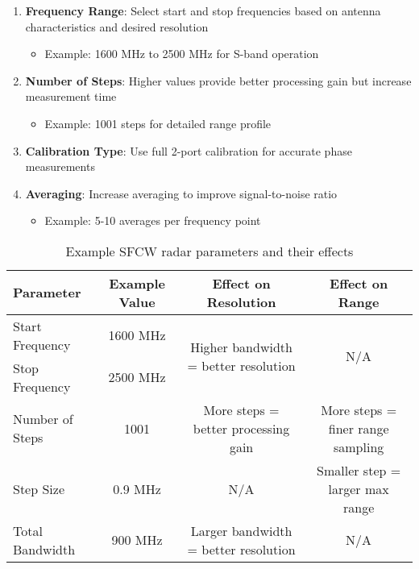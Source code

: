 \documentclass[12pt,a4paper]{article}
\begin{document}
\begin{enumerate}
    \item \textbf{Frequency Range}: Select start and stop frequencies based on antenna characteristics and desired resolution
    \begin{itemize}
        \item Example: 1600 MHz to 2500 MHz for S-band operation
    \end{itemize}
    
    \item \textbf{Number of Steps}: Higher values provide better processing gain but increase measurement time
    \begin{itemize}
        \item Example: 1001 steps for detailed range profile
    \end{itemize}
    
    \item \textbf{Calibration Type}: Use full 2-port calibration for accurate phase measurements
    
    \item \textbf{Averaging}: Increase averaging to improve signal-to-noise ratio
    \begin{itemize}
        \item Example: 5-10 averages per frequency point
    \end{itemize}
\end{enumerate}

\begin{table}[H]
    \centering
    \begin{tabular}{|l|c|c|c|}
        \hline
        \textbf{Parameter} & \textbf{Example Value} & \textbf{Effect on Resolution} & \textbf{Effect on Range} \\
        \hline
        Start Frequency & 1600 MHz & \multirow{2}{*}{Higher bandwidth = better resolution} & \multirow{2}{*}{N/A} \\
        Stop Frequency & 2500 MHz & & \\
        \hline
        Number of Steps & 1001 & More steps = better processing gain & More steps = finer range sampling \\
        \hline
        Step Size & 0.9 MHz & N/A & Smaller step = larger max range \\
        \hline
        Total Bandwidth & 900 MHz & Larger bandwidth = better resolution & N/A \\
        \hline
    \end{tabular}
    \caption{Example SFCW radar parameters and their effects}
    \label{tab:params}
\end{table}
\end{document}
